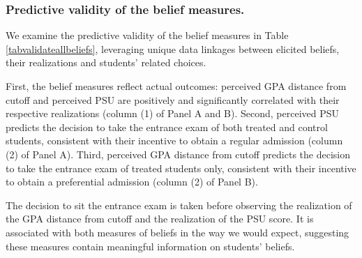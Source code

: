 












     
\subsubsection{Predictive validity of the 
belief measures.}\label{sec:predvalbeliefs} 
We examine the predictive validity of the belief measures in Table \ref{tabvalidateallbeliefs}, leveraging unique data linkages between elicited beliefs, their realizations and students' related choices.\par 



First, the belief measures reflect actual outcomes: perceived GPA distance from cutoff and perceived PSU are positively and significantly correlated with their respective realizations (column (1) of Panel A and B). 
Second, perceived PSU predicts the decision to take the entrance exam of both treated and control students, consistent with their incentive to obtain a regular admission (column (2) of Panel A).
Third, perceived GPA distance from cutoff predicts the decision to take the entrance exam of treated students only, consistent with their incentive to obtain a preferential admission (column (2) of Panel B).

The decision to sit the entrance exam is taken before observing the realization of the GPA distance from cutoff and the realization of the PSU score. It is associated with both measures of beliefs in the way we would expect, suggesting these measures contain meaningful information on students' beliefs.\par %




     



\clearpage

